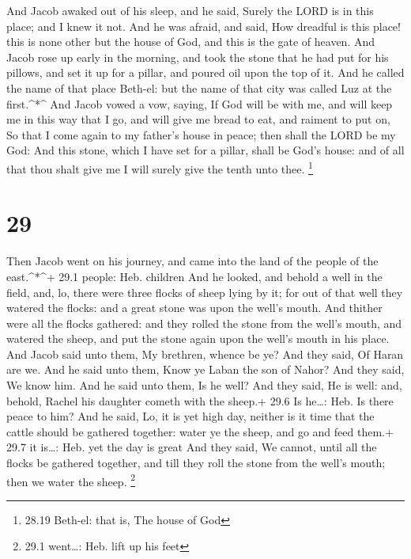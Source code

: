  And Jacob awaked out of his sleep, and he said, Surely the
LORD is in this place; and I knew it not.  And he was
afraid, and said, How dreadful is this place! this is none other but the
house of God, and this is the gate of heaven.  And Jacob
rose up early in the morning, and took the stone that he had put for his
pillows, and set it up for a pillar, and poured oil upon the top of it.
 And he called the name of that place Beth-el: but the name
of that city was called Luz at the first.\^{}*\^{}  And
Jacob vowed a vow, saying, If God will be with me, and will keep me in
this way that I go, and will give me bread to eat, and raiment to put
on,  So that I come again to my father's house in peace;
then shall the LORD be my God:  And this stone, which I
have set for a pillar, shall be God's house: and of all that thou shalt
give me I will surely give the tenth unto thee. \footnote{28.19 Beth-el:
  that is, The house of God}

\hypertarget{section-28}{%
\section{29}\label{section-28}}

 Then Jacob went on his journey, and came into the land of
the people of the east.\^{}*\^{}+ 29.1 people: Heb. children
 And he looked, and behold a well in the field, and, lo,
there were three flocks of sheep lying by it; for out of that well they
watered the flocks: and a great stone was upon the well's mouth.
 And thither were all the flocks gathered: and they rolled
the stone from the well's mouth, and watered the sheep, and put the
stone again upon the well's mouth in his place.  And Jacob
said unto them, My brethren, whence be ye? And they said, Of Haran are
we.  And he said unto them, Know ye Laban the son of Nahor?
And they said, We know him.  And he said unto them, Is he
well? And they said, He is well: and, behold, Rachel his daughter cometh
with the sheep.+ 29.6 Is he\ldots: Heb. Is there peace to him?
 And he said, Lo, it is yet high day, neither is it time
that the cattle should be gathered together: water ye the sheep, and go
and feed them.+ 29.7 it is\ldots: Heb. yet the day is great 
And they said, We cannot, until all the flocks be gathered together, and
till they roll the stone from the well's mouth; then we water the sheep.
\footnote{29.1 went\ldots: Heb. lift up his feet}

